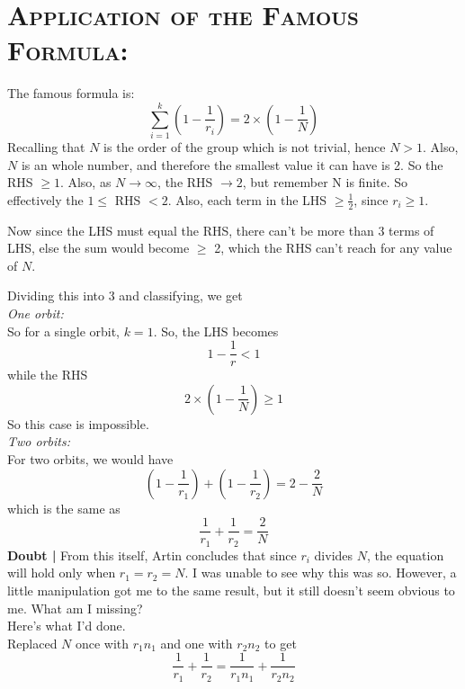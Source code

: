 \section{\textsc {Application of the Famous Formula: }}
The famous formula is:
\begin{equation}
\sum\limits_{i=1}^{k} (1 - \frac{1}{r_{i}}) = 2 \times (1 - \frac{1}{N})
\label{eqn.E}
\end{equation}
Recalling that $N$ is the order of the group which is not trivial, hence $N>1$. Also, $N$ is an whole number, and therefore the smallest value it can have is 2. So the RHS $\geq 1$. Also, as $N \to\infty$, the RHS $\to 2$, but remember N is finite. So effectively the $1\leq$ RHS $< 2$. Also, each term in the LHS $\geq \frac{1}{2}$, since $r_{i} \geq 1$.
\par
Now since the LHS must equal the RHS, there can't be more than 3 terms of LHS, else the sum would become $\geq$ 2, which the RHS can't reach for any value of $N$.
\par
Dividing this into 3 and classifying, we get\\
\emph{One orbit: }\\
So for a single orbit, $k=1$. So, the LHS becomes
\begin{equation}
1-\frac{1}{r} < 1
\end{equation}
while the RHS
\begin{equation}
2 \times (1 - \frac{1}{N}) \geq 1
\end{equation}
So this case is impossible.\\
\emph{Two orbits: }\\
For two orbits, we would have
\begin{equation}
(1 - \frac{1}{r_{1}}) + (1 - \frac{1}{r_{2}}) = 2 - \frac{2}{N}
\end{equation}
which is  the same as
\begin{equation}
\frac{1}{r_{1}} + \frac{1}{r_{2}} = \frac{2}{N}
\end{equation}
{\bf Doubt | } From this itself, Artin concludes that since $r_{i}$ divides $N$, the equation will hold only when $r_{1}=r_{2}=N$. I was unable to see why this was so. However, a little manipulation got me to the same result, but it still doesn't seem obvious to me. What am I missing?\\
Here's what I'd done.\\
Replaced $N$ once with $r_{1}n_{1}$ and one with $r_{2}n_{2}$ to get
\begin{equation}
\frac{1}{r_{1}} + \frac{1}{r_{2}} = \frac{1}{r_{1}n_{1}} + \frac{1}{r_{2}n_{2}}
\end{equation}
